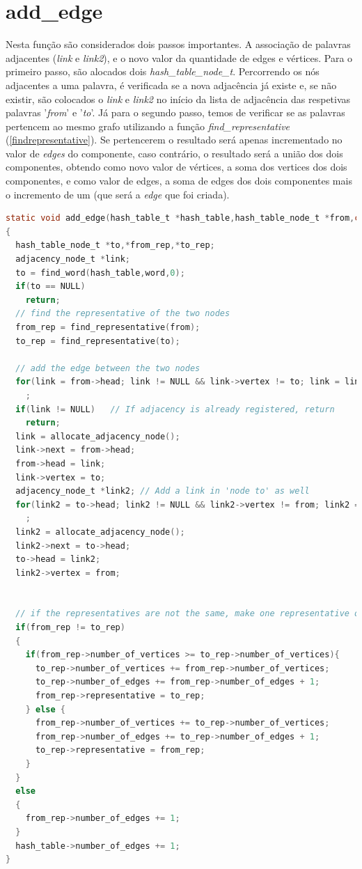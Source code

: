 	\section{add\_edge}
Nesta função são considerados dois passos importantes.
A associação de palavras adjacentes (\textit{link} e \textit{link2}), e o novo valor da quantidade de edges e vértices.
Para o primeiro passo, são alocados dois \textit{hash\_table\_node\_t}. Percorrendo os nós adjacentes 
a uma palavra, é verificada se a nova adjacência já existe e, se não existir, são colocados o \textit{link} e \textit{link2} no início
da lista de adjacência das respetivas palavras '\textit{from}' e '\textit{to}'.
Já para o segundo passo, temos de verificar se as palavras pertencem ao mesmo grafo utilizando a função \textit{find\_representative} (\ref{findrepresentative}).
Se pertencerem o resultado será apenas incrementado no valor de \textit{edges} do componente, caso contrário, o resultado será a união dos dois componentes, obtendo como novo valor de vértices, a soma 
dos vertices dos dois componentes, e como valor de edges, a soma de edges dos dois componentes mais o incremento de um (que será a \textit{edge} que foi criada).
	
	\label{addedge}
	\begin{lstlisting}[language=C]
static void add_edge(hash_table_t *hash_table,hash_table_node_t *from,const char *word)
{
  hash_table_node_t *to,*from_rep,*to_rep;
  adjacency_node_t *link;
  to = find_word(hash_table,word,0);
  if(to == NULL)
    return;
  // find the representative of the two nodes
  from_rep = find_representative(from);
  to_rep = find_representative(to);

  // add the edge between the two nodes 
  for(link = from->head; link != NULL && link->vertex != to; link = link->next)
    ;
  if(link != NULL)   // If adjacency is already registered, return
    return;
  link = allocate_adjacency_node();
  link->next = from->head;
  from->head = link;
  link->vertex = to;
  adjacency_node_t *link2; // Add a link in 'node to' as well
  for(link2 = to->head; link2 != NULL && link2->vertex != from; link2 = link2->next)
    ;
  link2 = allocate_adjacency_node();
  link2->next = to->head;
  to->head = link2;
  link2->vertex = from;
    

  // if the representatives are not the same, make one representative of the other
  if(from_rep != to_rep)
  {
    if(from_rep->number_of_vertices >= to_rep->number_of_vertices){
      to_rep->number_of_vertices += from_rep->number_of_vertices;
      to_rep->number_of_edges += from_rep->number_of_edges + 1;  
      from_rep->representative = to_rep;
    } else {
      from_rep->number_of_vertices += to_rep->number_of_vertices;
      from_rep->number_of_edges += to_rep->number_of_edges + 1;
      to_rep->representative = from_rep;
    }
  }
  else
  {
    from_rep->number_of_edges += 1;
  }
  hash_table->number_of_edges += 1;
}
	\end{lstlisting}
	
